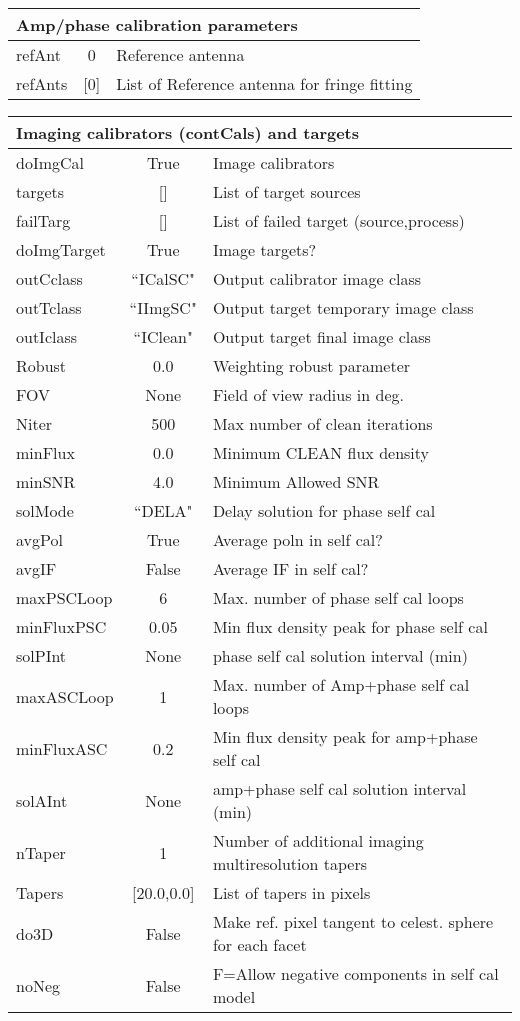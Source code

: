 \documentclass[11pt]{article}
\begin{document}
\begin{center}
\begin{tabular}{|l|c|l|}
\hline
\multicolumn{3}{|l|}{Amp/phase calibration parameters} \\
\hline
refAnt & 0 & Reference antenna \\
refAnts & [0] & List of Reference antenna for fringe fitting \\

\hline
\end{tabular}
\end{center}
\clearpage
\begin{center}
\begin{tabular}{|l|c|l|}

\hline
\multicolumn{3}{|l|}{Imaging calibrators (contCals) and targets} \\
\hline
doImgCal & True & Image calibrators \\
targets & [] & List of target sources \\
failTarg & [] & List of failed target (source,process) \\
doImgTarget & True & Image targets? \\
outCclass & ``ICalSC" & Output calibrator image class \\
outTclass & ``IImgSC" & Output target temporary image class \\
outIclass & ``IClean" & Output target final image class \\
Robust & 0.0 & Weighting robust parameter \\
FOV & None & Field of view radius in deg. \\
Niter & 500 & Max number of clean iterations \\
minFlux & 0.0 & Minimum CLEAN flux density \\
minSNR & 4.0 & Minimum Allowed SNR \\
solMode & ``DELA" & Delay solution for phase self cal \\
avgPol & True & Average poln in self cal? \\
avgIF & False & Average IF in self cal? \\
maxPSCLoop & 6 & Max. number of phase self cal loops \\
minFluxPSC & 0.05 & Min flux density peak for phase self cal \\
solPInt & None & phase self cal solution interval (min) \\
maxASCLoop & 1 & Max. number of Amp+phase self cal loops \\
minFluxASC & 0.2 & Min flux density peak for amp+phase self cal \\
solAInt & None & amp+phase self cal solution interval (min) \\
nTaper & 1 & Number of additional imaging multiresolution tapers \\
Tapers & [20.0,0.0] & List of tapers in pixels \\
do3D & False & Make ref. pixel tangent to celest. sphere for each facet \\
noNeg & False & F=Allow negative components in self cal model \\


\end{tabular}
\end{center}
\end{document}
